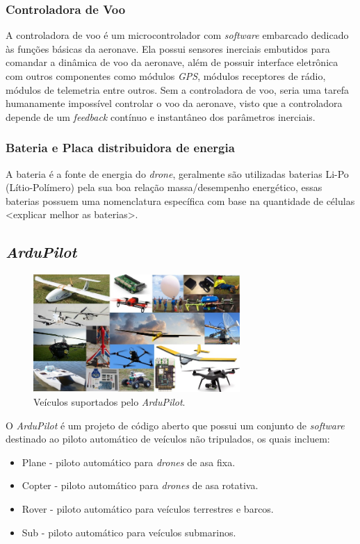 \documentclass[12pt,a4paper,oneside]{book}
\begin{document}
\subsubsection*{Controladora de Voo}

A controladora de voo é um microcontrolador com \textit{software} embarcado dedicado às funções básicas da aeronave. Ela possui sensores 
inerciais embutidos para comandar a dinâmica de voo da aeronave, além de possuir interface eletrônica com outros componentes como módulos \textit{GPS}, módulos receptores de rádio, módulos de telemetria entre outros. Sem a controladora de voo, seria uma tarefa humanamente impossível controlar o voo da aeronave, visto que a controladora depende de um \textit{feedback} contínuo e instantâneo dos parâmetros inerciais. 

\subsubsection*{Bateria e Placa distribuidora de energia}

A bateria é a fonte de energia do \textit{drone}, geralmente são utilizadas baterias Li-Po (Lítio-Polímero) pela sua boa relação massa/desempenho 
energético, essas baterias possuem uma nomenclatura específica com base na quantidade de células <explicar melhor as baterias>.

\subsection{\textit{ArduPilot}}
%
\begin{figure}[!htbp]
  \centering
  \includegraphics[width=0.7\textwidth]{Images/introducao/ardupilot_vehicles.jpg}
  \caption{Veículos suportados pelo \textit{ArduPilot}.}
  \label{fig:ardupilot_vehicles.jpg.0}
\end{figure}
%

O \textit{ArduPilot} é um projeto de código aberto que possui um conjunto de \textit{software} destinado ao piloto automático de veículos não tripulados, os quais incluem:
\begin{itemize}
  \item Plane - piloto automático para \textit{drones} de asa fixa.
  \item Copter - piloto automático para \textit{drones} de asa rotativa.
  \item Rover - piloto automático para veículos terrestres e barcos.
  \item Sub - piloto automático para veículos submarinos.
\end{itemize}
\end{document}
